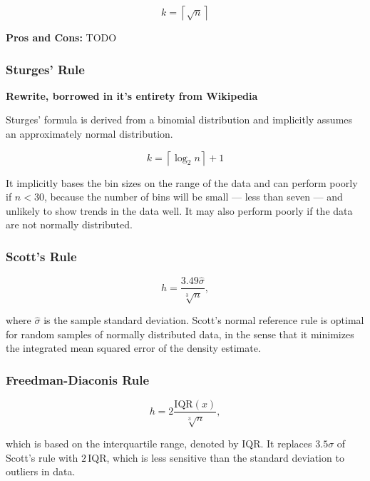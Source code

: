 \begin{equation}
    k = \left \lceil \sqrt{n} \right \rceil 
\end{equation}

\textbf{Pros and Cons:} TODO

\subsubsection{Sturges' Rule}

\textbf{Rewrite, borrowed in it's entirety from Wikipedia}

Sturges' formula is derived from a binomial distribution and implicitly assumes an approximately normal distribution.

\begin{equation}
    k = \left \lceil \log_2 n \right \rceil + 1 
\end{equation}

It implicitly bases the bin sizes on the range of the data and can perform poorly if $n < 30$, because the number of bins will be small — less than seven — and unlikely to show trends in the data well. It may also perform poorly if the data are not normally distributed.

\subsubsection{Scott's Rule}

\begin{equation}
    h = \frac{3.49 \hat{\sigma}}{\sqrt[3]{n}},
\end{equation}

where $\hat{\sigma}$ is the sample standard deviation. Scott's normal reference rule is optimal for random samples of normally distributed data, in the sense that it minimizes the integrated mean squared error of the density estimate. 

\subsubsection{Freedman-Diaconis Rule}

\begin{equation}
    h = 2 \frac{\mathrm{IQR}(x)}{\sqrt[3]{n}},
\end{equation}

which is based on the interquartile range, denoted by $\mathrm{IQR}$. It replaces $3.5\sigma$ of Scott's rule with $2\,\mathrm{IQR}$, which is less sensitive than the standard deviation to outliers in data.

